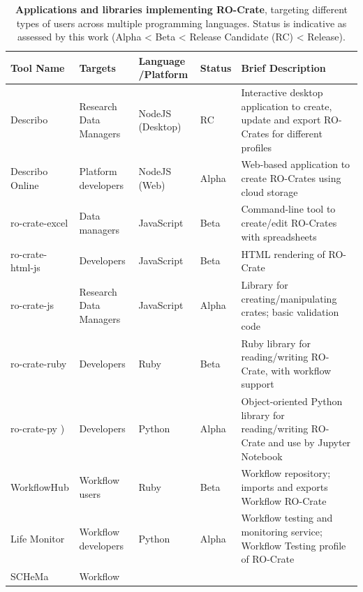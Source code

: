 \small
\begin{longtable}[]{@{}
>{\raggedright\arraybackslash}p{}
>{\raggedright\arraybackslash}p{}
>{\raggedright\arraybackslash}p{}
>{\raggedright\arraybackslash}p{}
>{\raggedright\arraybackslash}p{}@{}}
\caption[Applications and libraries implementing RO-Crate]{{\bf Applications and libraries implementing RO-Crate}, targeting
  different types of users across multiple programming languages. Status
  is indicative as assessed by this work (Alpha \textless{} Beta
  \textless{} Release Candidate (RC) \textless{} Release).
}
\label{ch5:tab1}\tabularnewline
\toprule
Tool Name & Targets & Language /Platform & Status & Brief Description \\
\midrule
\endhead
Describo \cite{La Rosa 2021d} &
Research Data Managers & NodeJS (Desktop) & RC & Interactive desktop
application to create, update and export RO-Crates for different
profiles \\
Describo Online
\cite{La Rosa 2021c} &
Platform developers & NodeJS (Web) & Alpha & Web-based application to
create RO-Crates using cloud storage \\
ro-crate-excel
\cite{Lynch 2022} & Data
managers & JavaScript & Beta & Command-line tool to create/edit
RO-Crates with spreadsheets \\
ro-crate-html-js
\cite{ro-crate-html-js} &
Developers & JavaScript & Beta & HTML rendering of RO-Crate \\
ro-crate-js
\cite{Sefton 2021b} & Research
Data Managers & JavaScript & Alpha & Library for creating/manipulating
crates; basic validation code \\
ro-crate-ruby
\cite{Bacall 2022b} &
Developers & Ruby & Beta & Ruby library for reading/writing RO-Crate,
with workflow support \\
ro-crate-py \cite{De Geest 2023a}) &
Developers & Python & Alpha & Object-oriented Python library for
reading/writing RO-Crate and use by Jupyter Notebook \\
WorkflowHub \cite{WorkflowHub 2023} & Workflow
users & Ruby & Beta & Workflow repository; imports and exports Workflow
RO-Crate \\
Life Monitor \cite{CRS4 2022} & Workflow
developers & Python & Alpha & Workflow testing and monitoring service;
Workflow Testing profile of RO-Crate \\
SCHeMa \cite{Vergoulis 2022} & Workflow

\end{longtable}
